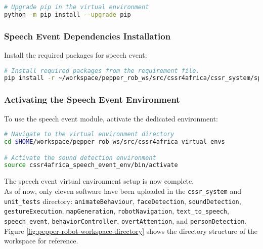 \documentclass{CSSRforAfrica}
\begin{document}
{\begin{lstlisting}[style=withoutNumbering, language=bash]
# Upgrade pip in the virtual environment
python -m pip install --upgrade pip
\end{lstlisting}

\subsubsection*{Speech Event Dependencies Installation}
Install the required packages for speech event:
\begin{lstlisting}[style=withoutNumbering, language=bash]
# Install required packages from the requirement file.
pip install -r ~/workspace/pepper_rob_ws/src/cssr4africa/cssr_system/speech_event/speech_event_requirements.txt
\end{lstlisting}

\subsubsection*{Activating the Speech Event Environment}
To use the speech event module, activate the dedicated environment:
\begin{lstlisting}[style=withoutNumbering, language=bash]
# Navigate to the virtual environment directory
cd $HOME/workspace/pepper_rob_ws/src/cssr4africa_virtual_envs

# Activate the sound detection environment
source cssr4africa_speech_event_env/bin/activate
\end{lstlisting} 

\noindent The speech event virtual environment setup is now complete. \\



\noindent As of now, only eleven software have been uploaded in the \texttt{cssr\_system} and \texttt{unit\_tests} directory: \texttt{animateBehaviour}, \texttt{faceDetection}, \texttt{soundDetection}, \texttt{gestureExecution}, \texttt{mapGeneration}, \texttt{robotNavigation}, \texttt{text\_to\_speech}, \texttt{speech\_event}, \texttt{behaviorController}, \texttt{overtAttention}, and \texttt{personDetection}. \\

\newpage
\noindent Figure \ref{fig:pepper-robot-workspace-directory} shows the directory structure of the workspace for reference.
\begin{figure}[H]


\end{figure}}
\end{document}
